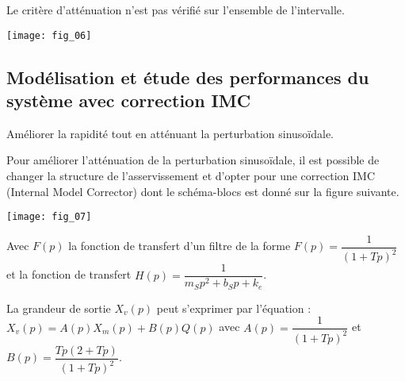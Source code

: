 \begin{multicols}{2}
\begin{corrige}
Le critère d'atténuation n'est pas vérifié sur l'ensemble de l'intervalle.
\end{corrige}
\else
\fi



\begin{center}
\texttt{[image: fig\_06]}
\end{center}



\subsection*{Modélisation et étude des performances du système avec correction IMC}

\begin{obj}
Améliorer la rapidité tout en atténuant la perturbation sinusoïdale.
\end{obj}

Pour améliorer l’atténuation de la perturbation sinusoïdale, il est possible de changer la
structure de l’asservissement et d’opter pour une correction IMC (Internal Model Corrector)
dont le schéma-blocs est donné sur la figure suivante.

\begin{center}
\texttt{[image: fig\_07]}
\end{center}

Avec $F(p)$ la fonction de transfert d’un filtre de la forme $F(p) = \dfrac{1}{\left(1+Tp\right)^2}$ et la fonction de
transfert $H(p) =\dfrac{1}{m_S p^2 + b_S p + k_e}$.



La grandeur de sortie $X_v(p)$ peut s’exprimer par l’équation : $X_v(p) = A(p)X_m(p) + B(p)Q(p)$ avec 
$A(p) = \dfrac{1}{\left(1+Tp\right)^2}$ et $B(p)=\dfrac{Tp\left(2+Tp \right)}{\left(1+Tp\right)^2}$.



\ifprof
\begin{corrige}
%
%
%
%
%
%


\end{corrige}
\end{multicols}
